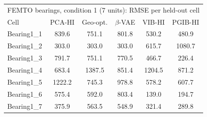 \begin{tabular}{l c c c c c}
\hline
\multicolumn{6}{l}{FEMTO bearings, condition 1 (7 units): RMSE per held-out cell}\\
 Cell & PCA-HI & Geo-opt. & $\beta$-VAE & VIB-HI & PGIB-HI \\
\hline
Bearing1\_1 & 839.6 & 751.1 & 801.8 & 530.2 & 480.9 \\
Bearing1\_2 & 303.0 & 303.0 & 303.0 & 615.7 & 1080.7 \\
Bearing1\_3 & 791.7 & 751.1 & 770.5 & 466.7 & 226.4 \\
Bearing1\_4 & 683.4 & 1387.5 & 851.4 & 1204.5 & 871.2 \\
Bearing1\_5 & 1222.2 & 745.3 & 978.8 & 578.2 & 607.7 \\
Bearing1\_6 & 575.4 & 592.0 & 803.4 & 139.0 & 194.7 \\
Bearing1\_7 & 375.9 & 563.5 & 548.9 & 321.4 & 289.8 \\
\hline
\end{tabular}

